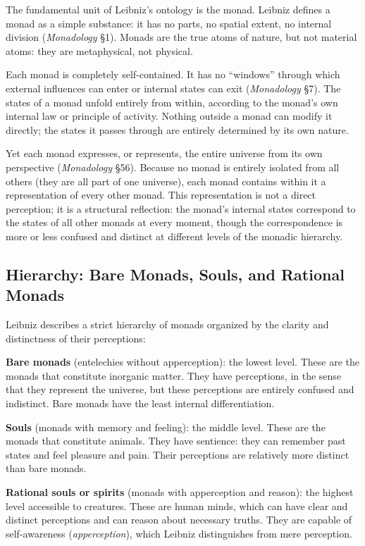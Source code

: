 \documentclass[12pt]{article}
\begin{document}
The fundamental unit of Leibniz's ontology is the monad. Leibniz defines
a monad as a simple substance: it has no parts, no spatial extent, no
internal division (\emph{Monadology} §1). Monads are the true atoms of
nature, but not material atoms: they are metaphysical, not physical.

Each monad is completely self-contained. It has no ``windows'' through
which external influences can enter or internal states can exit
(\emph{Monadology} §7). The states of a monad unfold entirely from
within, according to the monad's own internal law or principle of
activity. Nothing outside a monad can modify it directly; the states it
passes through are entirely determined by its own nature.

Yet each monad expresses, or represents, the entire universe from its
own perspective (\emph{Monadology} §56). Because no monad is entirely
isolated from all others (they are all part of one universe), each monad
contains within it a representation of every other monad. This
representation is not a direct perception; it is a structural
reflection: the monad's internal states correspond to the states of all
other monads at every moment, though the correspondence is more or less
confused and distinct at different levels of the monadic hierarchy.

\subsection{Hierarchy: Bare Monads, Souls, and Rational Monads}\label{hierarchy-bare-monads-souls-and-rational-monads}

Leibniz describes a strict hierarchy of monads organized by the clarity
and distinctness of their perceptions:

\textbf{Bare monads} (entelechies without apperception): the lowest
level. These are the monads that constitute inorganic matter. They have
perceptions, in the sense that they represent the universe, but these
perceptions are entirely confused and indistinct. Bare monads have the
least internal differentiation.

\textbf{Souls} (monads with memory and feeling): the middle level. These
are the monads that constitute animals. They have sentience: they can
remember past states and feel pleasure and pain. Their perceptions are
relatively more distinct than bare monads.

\textbf{Rational souls or spirits} (monads with apperception and
reason): the highest level accessible to creatures. These are human
minds, which can have clear and distinct perceptions and can reason
about necessary truths. They are capable of self-awareness
(\emph{apperception}), which Leibniz distinguishes from mere perception.
\end{document}
